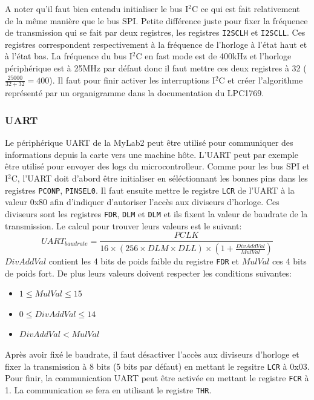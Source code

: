 \documentclass[a4paper]{article}
\begin{document}
A noter qu'il faut bien entendu initialiser le bus I$^2$C ce qui est fait relativement de la même
manière que le bus SPI. Petite différence juste pour fixer la fréquence de transmission
qui se fait par deux registres, les registres \texttt{I2SCLH} et \texttt{I2SCLL}.
Ces registres correspondent respectivement à la fréquence de l'horloge à l'état haut et à l'état
bas. La fréquence du bus I$^2$C en fast mode est de 400kHz et l'horloge périphérique
est à 25MHz par défaut donc il faut mettre ces deux registres à 32 ($\frac{25000}{32+32}=400$).
Il faut pour finir activer les interruptions I$^2$C et créer l'algorithme représenté
par un organigramme dans la documentation du LPC1769.

\subsubsection{UART}
Le périphérique UART de la MyLab2 peut être utilisé pour communiquer des informations
depuis la carte vers une machine hôte. L'UART peut par exemple être utilisé pour
envoyer des logs du microcontrolleur. Comme pour les bus SPI et I$^2$C, l'UART
doit d'abord être initialiser en séléctionnant les bonnes pins dans les registres
\texttt{PCONP}, \texttt{PINSEL0}. Il faut ensuite mettre le registre
\texttt{LCR} de l'UART à la valeur 0x80 afin d'indiquer d'autoriser l'accès aux diviseurs 
d'horloge. Ces diviseurs sont les registres \texttt{FDR}, \texttt{DLM}
et \texttt{DLM} et ils fixent la valeur de baudrate de la transmission.
Le calcul pour trouver leurs valeurs est le suivant:
\begin{equation*}
	UART_{baudrate}=\frac{PCLK}{16 \times (256 \times DLM \times DLL) \times (1 + \frac{DivAddVal}{MulVal})}
\end{equation*}
$DivAddVal$ contient les 4 bits de poids faible du registre \texttt{FDR} et
$MulVal$ ces 4 bits de poids fort. De plus leurs valeurs doivent respecter les conditions
suivantes:
\begin{itemize}[label=\textbullet]
	\item $1 \leq MulVal \leq 15$
	\item $0 \leq DivAddVal \leq 14$
	\item $DivAddVal < MulVal$ 
\end{itemize}
Après avoir fixé le baudrate, il faut désactiver l'accès aux diviseurs d'horloge
et fixer la transmission à 8 bits (5 bits par défaut) en mettant le regsitre
\texttt{LCR} à 0x03. Pour finir, la communication UART peut être activée
en mettant le registre \texttt{FCR} à 1. La communication se fera en utilisant
le registre \texttt{THR}.
\end{document}
